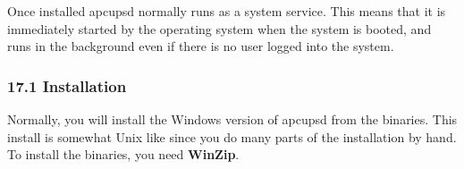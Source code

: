 Once installed apcupsd normally runs as a system service.  This means that it
is immediately started by the operating system when the system is booted, and
runs in the background even if there is no user logged into the system. 

\label{Installation}

\subsubsection*{17.1 Installation}

Normally, you will install the Windows version of apcupsd from the binaries.
This install is somewhat Unix like since you do many parts of the installation
by hand. To install the binaries, you need {\bf WinZip}.  

